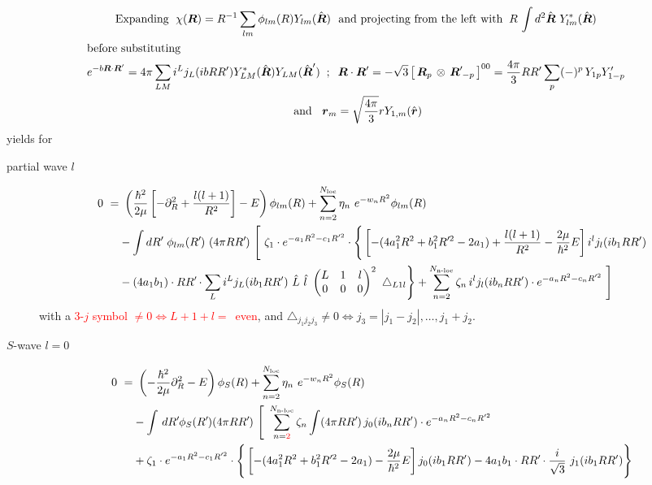 \documentclass[onecolumn,preprint,superscriptaddress,nofootinbib,notitlepage,10pt,linenumbers]{revtex4-1}
\newcommand*{\mprime}{^{\prime}\mkern-1.2mu}
\newcommand{\red}[1]{\textcolor{red}{#1}}
\newcommand{\la}{\label}
\newcommand{\ve}[1]{\ensuremath{\boldsymbol{#1}}}
\newcommand{\coup}[3]{\left[\,#1\,\otimes\,#2\,\right]^{#3}}
\newcommand{\threej}[6]{ \begin{pmatrix}
   #1 & #2 & #3 \\
   #4 & #5 & #6 
  \end{pmatrix}}
\begin{document}
\begin{gather}
\text{Expanding}~\;\chi(\ve{R})=R^{-1}\sum_{lm}\phi_{lm}(R)Y_{lm}(\hat{\ve{R}})~
\text{~and projecting from the left with}\;\;
R\,\int d^2\hat{\ve{R}}~Y^*_{lm}(\hat{\ve{R}})\\
\intertext{before substituting}
e^{-b\ve{R}\cdot\ve{R}'}=4\pi\sum_{LM}i^Lj_L(ib RR')Y^*_{LM}(\hat{\ve{R}})Y_{LM}(\hat{\ve{R}}')\;\;;\;\;
\ve{R}\cdot\ve{R}'=-\sqrt{3}\coup{\ve{R}_p}{\ve{R}\mprime_{-p}}{00}=\frac{4\pi}{3}RR'\sum_p(-)^p\,Y_{1p}Y'_{1-p}\nonumber\\
~\text{and~}\;\;\ve{r}_m=\sqrt{\frac{4\pi}{3}}rY_{1,m}(\hat{\ve{r}})
\end{gather}
yields for
\begin{description}
	\item[partial wave $l$]
\begin{subequations}\la{eq.rgm.sglnonloc.pw}
\begin{align}
0~=&~\left(\frac{\hbar^2}{2\mu}\left[-\partial^2_R+\frac{l(l+1)}{R^2}\right]-E\right)
\phi_{lm}(R)+\sum_{n=2}^{N_{\text{loc}}}\eta_n~e^{-w_nR^2}\phi_{lm}(R)\\
%
&-\int dR\mprime~\phi_{lm}(R\mprime)~(4\pi RR\mprime )~\Bigg[
%
~\zeta_1 \cdot e^{-a_1R^2-c_1R'^2}\cdot\Bigg\lbrace
\left[-(4a_1^2R^2+b_1^2R\mprime^2-2a_1)+\frac{l(l+1)}{R^2}-\frac{2\mu}{\hbar^2}E\right]
 i^l j_{l}(ib_1 RR')\nonumber\\
%
&-(4a_1b_1)\cdot RR\mprime\cdot
\sum_Li^Lj_L(ib_1 RR')~\hat{L}~\hat{l}~\threej{L}{1}{l}{0}{0}{0}^2~\triangle_{L1l}\Bigg\rbrace
%
+\sum_{n=2}^{N_{\text{n-loc}}}\zeta_n\,i^l j_l(ib_n RR')\cdot 
e^{-a_nR^2-c_nR'^2}~\Bigg]\la{eq.rgm.sglnonloc.pw.noloc}
\end{align}
\end{subequations}
with a \red{3-$j$ symbol $\neq0\Leftrightarrow L+1+l=$~even}, and $\triangle_{j_1j_2j_3}\neq0\Leftrightarrow j_3=|j_1-j_2|,\ldots,j_1+j_2$.

\item[$S$-wave $l=0$]
\begin{subequations}\la{eq.rgm.sglnonloc.pw}
\begin{align}
0~=&~\left(-\frac{\hbar^2}{2\mu}\partial^2_R-E\right)
\phi_{S}(R)+\sum_{n=2}^{N_{\text{loc}}}\eta_n~e^{-w_nR^2}\phi_{S}(R)\\
%
&-\int\,dR\mprime\phi_{S}(R\mprime)(4\pi RR\mprime )~\Bigg[
~\sum_{n=\red{2}}^{N_{\text{n-loc}}}\zeta_n\int
(4\pi RR\mprime)\,j_0(ib_n RR')\cdot 
e^{-a_nR^2-c_nR'^2}
\\
&+\zeta_1 \cdot e^{-a_1R^2-c_1R'^2}
\cdot\Bigg\lbrace
\left[-(4a_1^2R^2+b_1^2R\mprime^2-2a_1)-\frac{2\mu}{\hbar^2}E\right]
 j_0(ib_1 RR')-4a_1b_1\cdot RR\mprime\cdot
\frac{i}{\sqrt{3}}~j_1(ib_1 RR')\Bigg\rbrace\nonumber
%
\la{eq.rgm.sglnonloc.pw.noloc}
\end{align}
\end{subequations}


\end{description}
\end{document}
